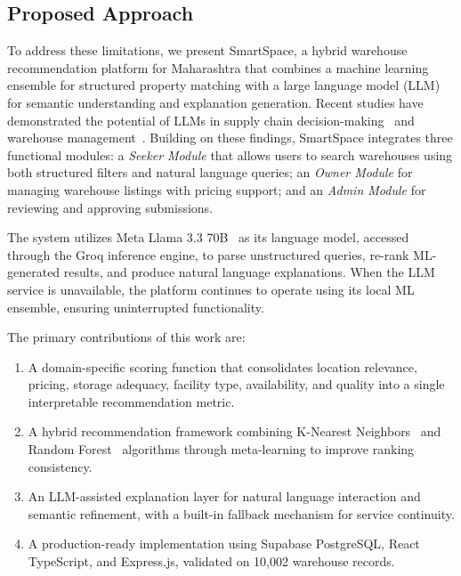 \documentclass[pdflatex,sn-mathphys-num]{sn-jnl}
\theoremstyle{thmstyleone}
\theoremstyle{thmstyletwo}
\theoremstyle{thmstylethree}
\begin{document}
\subsection{Proposed Approach}\label{subsec:approach}

To address these limitations, we present SmartSpace, a hybrid warehouse recommendation platform for Maharashtra that combines a machine learning ensemble for structured property matching with a large language model (LLM) for semantic understanding and explanation generation. Recent studies have demonstrated the potential of LLMs in supply chain decision-making~\cite{b3, b7} and warehouse management~\cite{b4, b9}. Building on these findings, SmartSpace integrates three functional modules: a \textit{Seeker Module} that allows users to search warehouses using both structured filters and natural language queries; an \textit{Owner Module} for managing warehouse listings with pricing support; and an \textit{Admin Module} for reviewing and approving submissions.

The system utilizes Meta Llama 3.3 70B~\cite{b13} as its language model, accessed through the Groq inference engine, to parse unstructured queries, re-rank ML-generated results, and produce natural language explanations. When the LLM service is unavailable, the platform continues to operate using its local ML ensemble, ensuring uninterrupted functionality.

The primary contributions of this work are:
\begin{enumerate}
    \item A domain-specific scoring function that consolidates location relevance, pricing, storage adequacy, facility type, availability, and quality into a single interpretable recommendation metric.
    \item A hybrid recommendation framework combining K-Nearest Neighbors~\cite{b11} and Random Forest~\cite{b6} algorithms through meta-learning to improve ranking consistency.
    \item An LLM-assisted explanation layer for natural language interaction and semantic refinement, with a built-in fallback mechanism for service continuity.
    \item A production-ready implementation using Supabase PostgreSQL, React TypeScript, and Express.js, validated on 10,002 warehouse records.
\end{enumerate}

\end{document}
